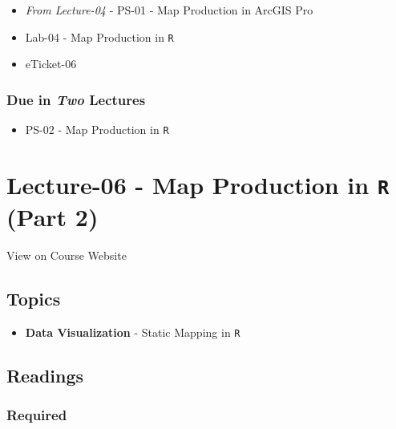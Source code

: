 \documentclass[
]{book}
\providecommand{\tightlist}{%
  \setlength{\itemsep}{0pt}\setlength{\parskip}{0pt}}
\begin{document}
\begin{itemize}
\tightlist
\item
  \emph{From Lecture-04} - PS-01 - Map Production in ArcGIS Pro
\item
  Lab-04 - Map Production in \texttt{R}
\item
  eTicket-06
\end{itemize}

\hypertarget{due-in-two-lectures-1}{%
\subsubsection*{\texorpdfstring{Due in \emph{Two} Lectures}{Due in Two Lectures}}\label{due-in-two-lectures-1}}

\begin{itemize}
\tightlist
\item
  PS-02 - Map Production in \texttt{R}
\end{itemize}

\hypertarget{lecture-06---map-production-in-r-part-2}{%
\section*{\texorpdfstring{Lecture-06 - Map Production in \texttt{R} (Part 2)}{Lecture-06 - Map Production in R (Part 2)}}\label{lecture-06---map-production-in-r-part-2}}

View on Course Website

\hypertarget{topics-6}{%
\subsection*{Topics}\label{topics-6}}

\begin{itemize}
\tightlist
\item
  \textbf{Data Visualization} - Static Mapping in \texttt{R}
\end{itemize}

\hypertarget{readings-7}{%
\subsection*{Readings}\label{readings-7}}

\hypertarget{required-4}{%
\subsubsection*{Required}\label{required-4}}
\end{document}
